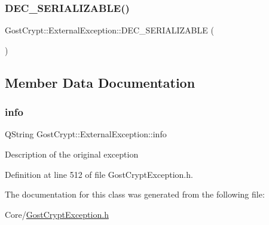 \subsubsection{\texorpdfstring{D\+E\+C\+\_\+\+S\+E\+R\+I\+A\+L\+I\+Z\+A\+B\+L\+E()}{DEC\_SERIALIZABLE()}}
{\footnotesize\ttfamily Gost\+Crypt\+::\+External\+Exception\+::\+D\+E\+C\+\_\+\+S\+E\+R\+I\+A\+L\+I\+Z\+A\+B\+LE (\begin{DoxyParamCaption}\item[{\hyperlink{class_gost_crypt_1_1_external_exception}{External\+Exception}}]{ }\end{DoxyParamCaption})\hspace{0.3cm}{\ttfamily [protected]}}



\subsection{Member Data Documentation}
\mbox{\label{class_gost_crypt_1_1_external_exception_ab26b2883a39100eff9612c77de420eec}} 
\subsubsection{\texorpdfstring{info}{info}}
{\footnotesize\ttfamily Q\+String Gost\+Crypt\+::\+External\+Exception\+::info\hspace{0.3cm}{\ttfamily [protected]}}

Description of the original exception 

Definition at line 512 of file Gost\+Crypt\+Exception.\+h.



The documentation for this class was generated from the following file\+:\begin{DoxyCompactItemize}
\item 
Core/\hyperlink{_gost_crypt_exception_8h}{Gost\+Crypt\+Exception.\+h}\end{DoxyCompactItemize}
